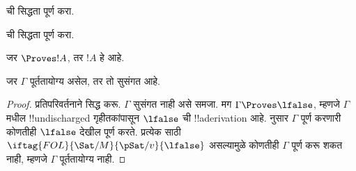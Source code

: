 \documentclass[../../../include/open-logic-section]{subfiles}
\begin{document}
\begin{prob}
 ची सिद्धता पूर्ण करा.
\end{prob}
\tagendprob

\begin{prob}
 ची सिद्धता पूर्ण करा.
\end{prob}
\tagendprob

\begin{cor}
जर $\Proves !A$, तर $!A$ हे  आहे.
\end{cor}

\begin{cor}
जर $\Gamma$ पूर्ततायोग्य असेल, तर तो सुसंगत आहे.
\end{cor}

\begin{proof}
प्रतिपरिवर्तनाने सिद्ध करू. $\Gamma$ सुसंगत नाही असे समजा. मग
$\Gamma \Proves \lfalse$, म्हणजे $\Gamma$ मधील !!{undischarged}
गृहीतकांपासून $\lfalse$ ची !!a{derivation} आहे. 
नुसार $\Gamma$ पूर्ण करणारी कोणतीही
$\lfalse$ देखील पूर्ण करते. प्रत्येक
साठी $\iftag{FOL}{\Sat/{M}}{\pSat/{v}}{\lfalse}$ असल्यामुळे कोणतीही
 $\Gamma$ पूर्ण करू शकत नाही,
म्हणजे $\Gamma$ पूर्ततायोग्य नाही.
\end{proof}
\end{document}
